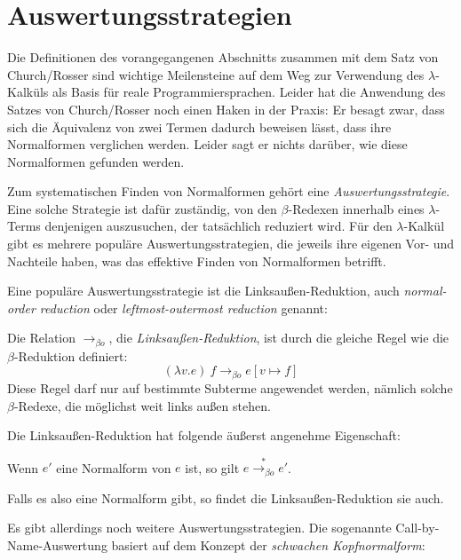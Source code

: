 \section{Auswertungsstrategien}
\label{sec:lambda-evaluation-strategies}

Die Definitionen des vorangegangenen Abschnitts zusammen mit dem Satz
von Church/\linebreak[0]Rosser sind wichtige Meilensteine auf dem Weg zur
Verwendung des $\lambda$-Kalküls als Basis für reale
Programmiersprachen.  Leider hat die Anwendung des Satzes von
Church/Rosser noch einen Haken in der Praxis: Er besagt zwar, dass sich
die Äquivalenz von zwei Termen dadurch beweisen lässt, dass ihre
Normalformen verglichen werden.  Leider sagt er nichts darüber,
wie diese Normalformen gefunden werden.

Zum systematischen Finden von Normalformen gehört
eine \textit{Auswertungsstrategie}.  Eine
solche Strategie ist dafür zuständig, von den $\beta$-Redexen
innerhalb eines $\lambda$-Terms denjenigen auszusuchen, der
tatsächlich reduziert wird.  Für den $\lambda$-Kalkül gibt es mehrere
populäre Auswertungsstrategien, die jeweils ihre eigenen Vor- und
Nachteile haben, was das effektive Finden von Normalformen betrifft.

Eine populäre Auswertungsstrategie ist die Linksaußen-Reduktion, auch
\textit{normal-order reduction} oder
\textit{leftmost-outermost reduction} genannt:
%
\begin{definition}
  Die Relation $\rightarrow_{\beta o}$, die
  \textit{Linksaußen-Reduktion}, ist durch die gleiche Regel wie
  die $\beta$-Reduktion definiert:
  \begin{displaymath}
    (\lambda v.e)~f \rightarrow_{\beta o} e[v\mapsto f]
  \end{displaymath}
  Diese Regel darf nur auf bestimmte Subterme angewendet werden,
  nämlich solche $\beta$-Redexe, die möglichst weit
  links außen stehen.
\end{definition}
%
Die Linksaußen-Reduktion hat folgende äußerst angenehme Eigenschaft:
%
\begin{satz}
  Wenn $e'$ eine Normalform von $e$ ist, so gilt
  $e\overset{\ast}{\rightarrow_{\beta o}} e'$.
\end{satz}
%
Falls es also eine Normalform gibt, so findet die Linksaußen-Reduktion
sie auch.

Es gibt allerdings noch weitere Auswertungsstrategien.  Die sogenannte
Call-by-Name-Auswertung basiert auf dem Konzept der \textit{schwachen
  Kopfnormalform}:

